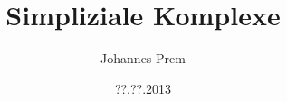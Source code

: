 
\subject{Seminar: Topologie vs. Kombinatorik}
\title{Simpliziale Komplexe}
\author{Johannes Prem}
\date{??.??.2013}

\maketitle
